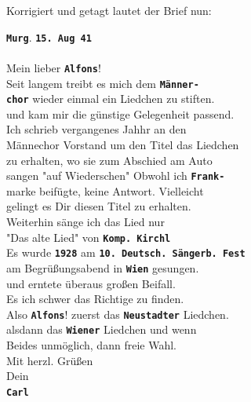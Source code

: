 \documentclass[12pt, a4paper, ngerman, bidi=default]{article}
\begin{document}
Korrigiert und getagt lautet der Brief nun:
\begin{tcolorbox}[colback=oldLetter, colframe=black, sharp corners, width=\textwidth]
  \textbf{\colorbox{place}{\texttt{Murg}}}.  \textbf{\colorbox{date}{\texttt{15. Aug 41}}} \\
\\
Mein lieber  \textbf{\colorbox{person}{\texttt{Alfons}}}!\\
Seit langem treibt es mich dem  \textbf{\colorbox{organization}{\texttt{Männer-}}}\\
\textbf{\colorbox{organization}{\texttt{chor}}} wieder einmal ein Liedchen zu stiften.\\
und kam mir die günstige Gelegenheit passend.\\
Ich schrieb vergangenes Jahhr an den\\
Männechor Vorstand um den Titel das Liedchen\\
zu erhalten, wo sie zum Abschied am Auto \\
sangen "auf Wiederschen" Obwohl ich  \textbf{\colorbox{unclear}{\texttt{Frank-}}}\\
marke beifügte, keine Antwort. Vielleicht\\
gelingt es Dir diesen Titel zu erhalten.\\
Weiterhin sänge ich das Lied nur\\
"Das alte Lied" von  \textbf{\colorbox{abbrev}{\texttt{Komp.}}}\textbf{\colorbox{person}{\texttt{ Kirchl}}}\\
Es wurde \textbf{\colorbox{date}{\texttt{1928}}} am \textbf{\colorbox{eventTag}{\texttt{10. Deutsch. Sängerb. Fest}}}\\
am Begrüßungsabend in \textbf{\colorbox{place}{\texttt{Wien}}} gesungen.\\
und erntete überaus großen Beifall.\\
Es ich schwer das Richtige zu finden.\\
Also \textbf{\colorbox{person}{\texttt{Alfons}}}! zuerst das \textbf{\colorbox{place}{\texttt{Neustadter}}} Liedchen.\\
alsdann das \textbf{\colorbox{place}{\texttt{Wiener}}} Liedchen und wenn\\
Beides unmöglich, dann freie Wahl.\\
Mit herzl. Grüßen \\
Dein\\
\textbf{\colorbox{person}{\texttt{Carl}}}\\
\end{tcolorbox}
\end{document}
